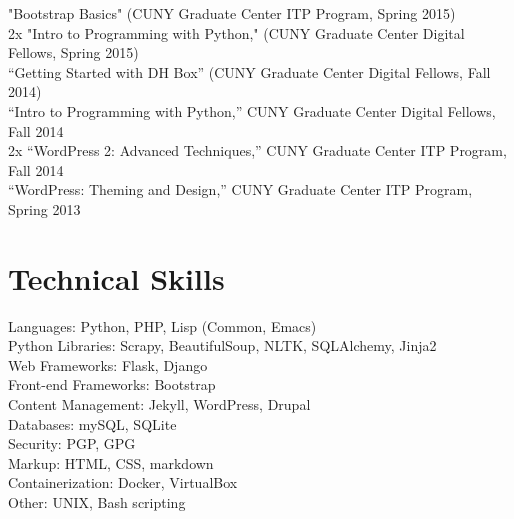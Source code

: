 \documentclass[11pt]{article}
\begin{document}
"Bootstrap Basics" (CUNY Graduate Center ITP Program, Spring 2015)\\
2x "Intro to Programming with Python," (CUNY Graduate Center Digital Fellows, Spring 2015)\\
“Getting Started with DH Box” (CUNY Graduate Center Digital Fellows, Fall 2014)\\
“Intro to Programming with Python,” CUNY Graduate Center Digital Fellows, Fall 2014\\
2x “WordPress 2: Advanced Techniques,” CUNY Graduate Center ITP Program, Fall 2014\\
“WordPress: Theming and Design,” CUNY Graduate Center ITP Program, Spring 2013\\

\section*{Technical Skills}
\label{sec:orgheadline11}

Languages: Python, PHP, Lisp (Common, Emacs)\\
Python Libraries: Scrapy, BeautifulSoup, NLTK, SQLAlchemy, Jinja2\\
Web Frameworks: Flask, Django\\
Front-end Frameworks: Bootstrap\\
Content Management: Jekyll, WordPress, Drupal\\
Databases: mySQL, SQLite\\
Security: PGP, GPG\\
Markup: HTML, CSS, markdown\\
Containerization: Docker, VirtualBox\\
Other: UNIX, Bash scripting\\
\end{document}
